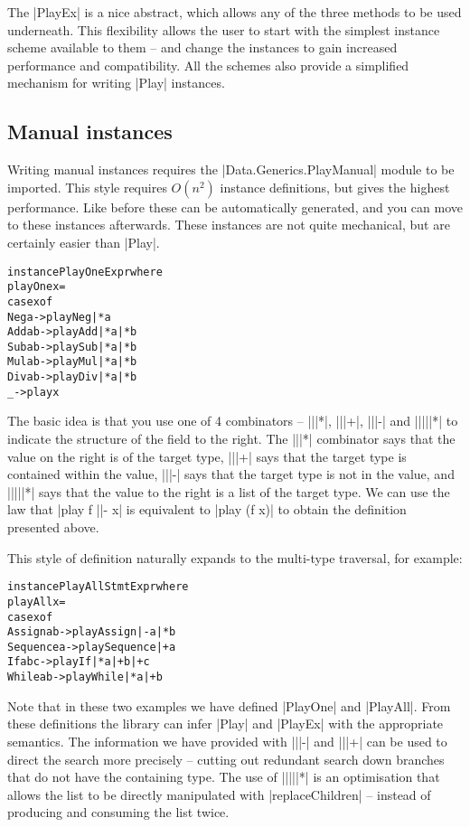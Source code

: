 \documentclass[preprint]{sigplanconf}
\newenvironment{code}{\begin{alltt}\small}{\end{alltt}}
\begin{document}
The |PlayEx| is a nice abstract, which allows any of the three methods to be used underneath. This flexibility allows the user to start with the simplest instance scheme available to them -- and change the instances to gain increased performance and compatibility. All the schemes also provide a simplified mechanism for writing |Play| instances.

\subsection{Manual instances}

Writing manual instances requires the |Data.Generics.PlayManual| module to be imported. This style requires $O(n^2)$ instance definitions, but gives the highest performance. Like before these can be automatically generated, and you can move to these instances afterwards. These instances are not quite mechanical, but are certainly easier than |Play|.

\begin{code}
instance PlayOne Expr where
    playOne x =
        case x of
            Neg  a    -> play Neg  |* a
            Add  a b  -> play Add  |* a |* b
            Sub  a b  -> play Sub  |* a |* b
            Mul  a b  -> play Mul  |* a |* b
            Div  a b  -> play Div  |* a |* b
            _         -> play x
\end{code}

The basic idea is that you use one of 4 combinators -- |||*|, |||+|, |||-| and |||||*| to indicate the structure of the field to the right. The |||*| combinator says that the value on the right is of the target type, |||+| says that the target type is contained within the value, |||-| says that the target type is not in the value, and |||||*| says that the value to the right is a list of the target type. We can use the law that |play f ||- x| is equivalent to |play (f x)| to obtain the definition presented above.

This style of definition naturally expands to the multi-type traversal, for example:

\begin{code}
instance PlayAll Stmt Expr where
    playAll x =
        case x of
            Assign a b -> play Assign |- a |* b
            Sequence a -> play Sequence |+ a
            If a b c -> play If |* a |+ b |+ c
            While a b -> play While |* a |+ b
\end{code}

Note that in these two examples we have defined |PlayOne| and |PlayAll|. From these definitions the library can infer |Play| and |PlayEx| with the appropriate semantics. The information we have provided with |||-| and |||+| can be used to direct the search more precisely -- cutting out redundant search down branches that do not have the containing type. The use of |||||*| is an optimisation that allows the list to be directly manipulated with |replaceChildren| -- instead of producing and consuming the list twice.
\end{document}

